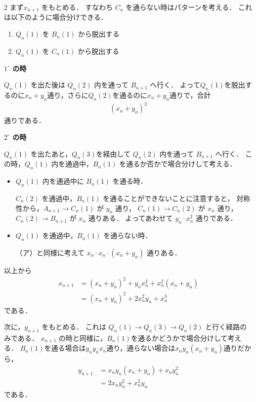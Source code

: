 \documentclass[../../main.tex]{subfiles}
\begin{document}
\begin{multicols}{2}
  まず$x_{n+1}$ をもとめる．
  すなわち $C_n$ を通らない時はパターンを考える．
  これは以下のように場合分けできる．

  \begin{enumerate}
    \item[$1^\circ$] $Q_n(1)$ を $B_n(1)$ から脱出する
    \item[$2^\circ$] $Q_n(1)$ を $C_n(1)$ から脱出する
  \end{enumerate}

  \textbf{$1^\circ$ の時}

  $Q_n(1)$ を出た後は $Q_n(2)$ 内を通って $B_{n+1}$ へ行く．
  よって$Q_n(1)$を脱出するのに$x_n+y_n$通り，さらに$Q_n(2)$を通るのに$x_n+y_n$通りで，合計
  \begin{align}
    (x_n+y_n)^2
  \end{align}
  通りである．

  \textbf{$2^\circ$ の時}

  $Q_n(1)$ を出たあと，$Q_n(3)$を経由して $Q_n(2)$ 内を通って $B_{n+1}$ へ行く．
  この時，$Q_n(1)$ 内を通過中，$B_n(1)$ を通るか否かで場合分けして考える．

  \begin{itemize}
    \item[（ア）] $Q_n(1)$ 内を通過中に $B_n(1)$ を通る時．

      $C_n(2)$ を通過中，$B_n(1)$ を通ることができないことに注意すると，
      対称性から，$A_{n+1} \to C_n(1)$ が $y_n$ 通り，
      $C_n(1) \to C_n(2)$ が $x_n$ 通り，
      $C_n(2) \to B_{n+1}$ が $x_n$ 通りある．
      よってあわせて $y_n \cdot x_n^2$ 通りである．
    \item[（イ）] $Q_n(1)$ を通過中，$B_n(1)$ を通らない時．

      （ア）と同様に考えて $x_n \cdot x_n \cdot (x_n+y_n)$ 通りある．
  \end{itemize}

  以上から
  \begin{align}
    x_{n+1}
    & = (x_n+y_n)^2 + y_nx^2_n + x^2_n(x_n+y_n) \\
    & = (x_n+y_n)^2 + 2x_n^2y_n + x_n^3
  \end{align}
  である．

  次に，$y_{n+1}$ をもとめる．
  これは $Q_n(1) \to Q_n(3) \to Q_n(2)$ と行く経路のみである．
  $x_{n+1}$ の時と同様に，$B_n(1)$を通るかどうかで場合分けして考える．
  $B_n(1)$を通る場合は$y_ny_nx_n$通り，通らない場合は$x_ny_n(x_n+y_n)$通りだから，
  \begin{align}
    y_{n+1}
    & = x_ny_n(x_n+y_n) + x_ny_n^2 \\
    & = 2x_n y_n^2 + x_n^2 y_n
  \end{align}
  である．


\end{multicols}
\end{document}
